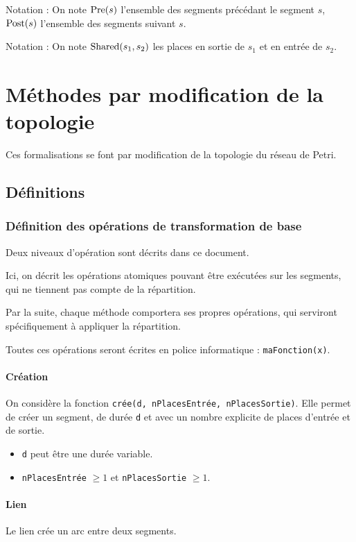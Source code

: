 Notation : On note $\operatorname{Pre}(s)$ l'ensemble des segments précédant le segment $s$, $\operatorname{Post}(s)$ l'ensemble des segments suivant $s$.

Notation : On note $\operatorname{Shared}(s_1, s_2)$ les places en sortie de $s_1$ et en entrée de $s_2$.

\section{Méthodes par modification de la topologie}
Ces formalisations se font par modification de la topologie du réseau de Petri.

\subsection{Définitions}

\subsubsection{Définition des opérations de transformation de base}
Deux niveaux d'opération sont décrits dans ce document.

Ici, on décrit les opérations atomiques pouvant être exécutées sur les segments, qui ne tiennent pas compte de la répartition. 

Par la suite, chaque méthode comportera ses propres opérations, qui serviront spécifiquement à appliquer la répartition. 

Toutes ces opérations seront écrites en police informatique : \texttt{maFonction(x)}.

\paragraph{Création}
On considère la fonction \texttt{crée(d, nPlacesEntrée, nPlacesSortie)}. Elle permet de créer un segment, de durée \texttt{d} et avec un nombre explicite de places d'entrée et de sortie.

\begin{itemize}
\item \texttt{d} peut être une durée variable.
\item \texttt{nPlacesEntrée} $ \geq 1 $ et \texttt{nPlacesSortie} $ \geq 1 $.
\end{itemize}
\paragraph{Lien}
Le lien crée un arc entre deux segments.

